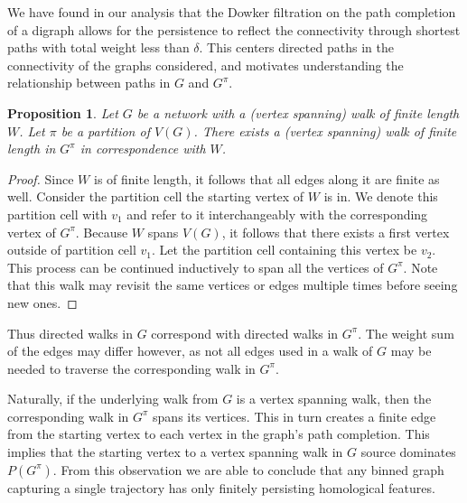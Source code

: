 \documentclass[pdflatex,bst/sn-mathphys-num]{sn-jnl}%
\theoremstyle{thmstyleone}%
\newtheorem{prop}[theorem]{Proposition}%
\theoremstyle{definition}
\theoremstyle{thmstyletwo}%
\theoremstyle{thmstylethree}%
\begin{document}

We have found in our analysis that the Dowker filtration on the path completion of a digraph allows for the persistence to reflect the connectivity through shortest paths with total weight less than $\delta$. This centers directed paths in the connectivity of the graphs considered, and motivates understanding the relationship between paths in $G$ and $G^\pi$. 

\begin{prop}\label{prop:quotientwalk}
    Let $G$ be a network with a (vertex spanning) walk of finite length $W$. Let $\pi$ be a partition of $V(G)$. There exists a (vertex spanning) walk of finite length in $G^\pi$ in correspondence with $W$.
\end{prop}


\begin{proof}    
    Since $W$ is of finite length, it follows that all edges along it are finite as well. Consider the partition cell the starting vertex of $W$ is in. We denote this partition cell with $v_1$ and refer to it interchangeably with the corresponding vertex of $G^\pi$. Because $W$ spans $V(G)$, it follows that there exists a first vertex outside of partition cell $v_1$. Let the partition cell containing this vertex be $v_2$. This process can be continued inductively to span all the vertices of $G^\pi$. Note that this walk may revisit the same vertices or edges multiple times before seeing new ones.
\end{proof}

Thus directed walks in $G$ correspond with directed walks in $G^\pi$. The weight sum of the edges may differ however, as not all edges used in a walk of $G$ may be needed to traverse the corresponding walk in $G^\pi$.

Naturally, if the underlying walk from $G$ is a vertex spanning walk, then the corresponding  walk in $G^\pi$ spans its vertices. This in turn creates a finite edge from the starting vertex to each vertex in the graph's path completion. This implies that the starting vertex to a vertex spanning walk in $G$ source dominates $P(G^\pi)$. From this observation we are able to conclude that any binned graph capturing a single trajectory has only finitely persisting homological features.
\end{document}
